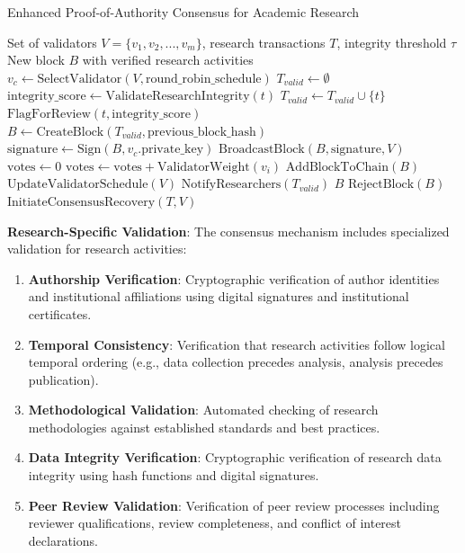 \documentclass[10pt,twocolumn]{article}
\begin{document}
\begin{algorithm}[H]
\caption{Enhanced Proof-of-Authority Consensus for Academic Research}
\label{alg:poa_consensus}
\begin{algorithmic}[1]
\REQUIRE Set of validators $V = \{v_1, v_2, ..., v_m\}$, research transactions $T$, integrity threshold $\tau$
\ENSURE New block $B$ with verified research activities
\STATE $v_c \leftarrow \text{SelectValidator}(V, \text{round\_robin\_schedule})$
\STATE $T_{valid} \leftarrow \emptyset$
    \STATE $\text{integrity\_score} \leftarrow \text{ValidateResearchIntegrity}(t)$
        \STATE $T_{valid} \leftarrow T_{valid} \cup \{t\}$
    \ELSE
        \STATE $\text{FlagForReview}(t, \text{integrity\_score})$
    \ENDIF
\ENDFOR
\STATE $B \leftarrow \text{CreateBlock}(T_{valid}, \text{previous\_block\_hash})$
\STATE $\text{signature} \leftarrow \text{Sign}(B, v_c.\text{private\_key})$
\STATE $\text{BroadcastBlock}(B, \text{signature}, V)$
\STATE $\text{votes} \leftarrow 0$
        \STATE $\text{votes} \leftarrow \text{votes} + \text{ValidatorWeight}(v_i)$
    \ENDIF
\ENDFOR
{}
    \STATE $\text{AddBlockToChain}(B)$
    \STATE $\text{UpdateValidatorSchedule}(V)$
    \STATE $\text{NotifyResearchers}(T_{valid})$
    \RETURN $B$
\ELSE
    \STATE $\text{RejectBlock}(B)$
    \STATE $\text{InitiateConsensusRecovery}(T, V)$
\ENDIF
\end{algorithmic}
\end{algorithm}

\textbf{Research-Specific Validation}: The consensus mechanism includes specialized validation for research activities:

\begin{enumerate}
    \item \textbf{Authorship Verification}: Cryptographic verification of author identities and institutional affiliations using digital signatures and institutional certificates.
    
    \item \textbf{Temporal Consistency}: Verification that research activities follow logical temporal ordering (e.g., data collection precedes analysis, analysis precedes publication).
    
    \item \textbf{Methodological Validation}: Automated checking of research methodologies against established standards and best practices.
    
    \item \textbf{Data Integrity Verification}: Cryptographic verification of research data integrity using hash functions and digital signatures.
    
    \item \textbf{Peer Review Validation}: Verification of peer review processes including reviewer qualifications, review completeness, and conflict of interest declarations.
\end{enumerate}
\end{document}
